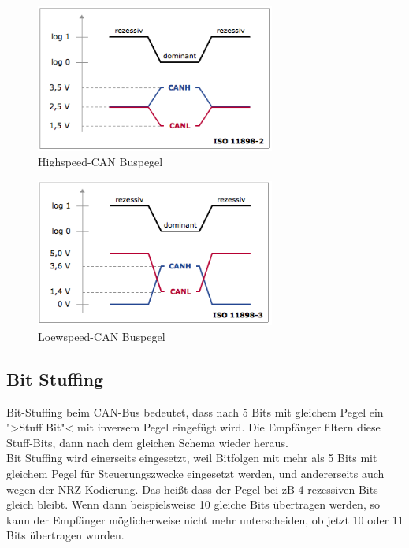 \begin{figure}[h] 
\centering
\includegraphics[width=0.7\textwidth]{figures/highcan}
\caption{Highspeed-CAN Buspegel \citep{VEC}} 
\label{pic:highcan}
\end{figure} 

\begin{figure}[h] 
\centering
\includegraphics[width=0.7\textwidth]{figures/lowcan}
\caption{Loewspeed-CAN Buspegel \citep{VEC}} 
\label{pic:lowcan}
\end{figure}

\clearpage
\newpage
\subsection{Bit Stuffing}
\label{sec:bitstuffing} 
Bit-Stuffing beim CAN-Bus bedeutet, dass
nach 5 Bits mit gleichem Pegel ein ">Stuff Bit"< mit inversem Pegel
eingefügt wird. Die Empfänger filtern diese Stuff-Bits, dann nach dem
gleichen Schema wieder heraus.
\\ Bit Stuffing wird einerseits
eingesetzt, weil Bitfolgen mit mehr als 5 Bits mit gleichem Pegel für
Steuerungszwecke eingesetzt werden, und andererseits auch wegen der
NRZ-Kodierung. Das heißt dass der Pegel bei zB 4 rezessiven Bits
gleich bleibt. Wenn dann beispielsweise 10 gleiche Bits übertragen
werden, so kann der Empfänger möglicherweise nicht mehr unterscheiden,
ob jetzt 10 oder 11 Bits übertragen wurden.
	
